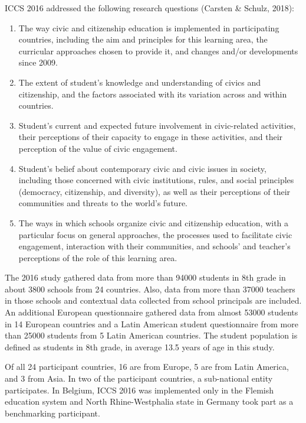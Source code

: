 \documentclass[12pt,a4paper,oneside]{reedthesis}
\providecommand{\tightlist}{%
  \setlength{\itemsep}{0pt}\setlength{\parskip}{0pt}}
\begin{document}
ICCS 2016 addressed the following research questions (Carsten \& Schulz, 2018):
\begin{enumerate}
\def\labelenumi{\arabic{enumi}.}
\tightlist
\item
  The way civic and citizenship education is implemented in participating countries, including the aim and principles for this learning area, the curricular approaches chosen to provide it, and changes and/or developments since 2009.\\
\item
  The extent of student's knowledge and understanding of civics and citizenship, and the factors associated with its variation across and within countries.\\
\item
  Student's current and expected future involvement in civic-related activities, their perceptions of their capacity to engage in these activities, and their perception of the value of civic engagement.\\
\item
  Student's belief about contemporary civic and civic issues in society, including those concerned with civic institutions, rules, and social principles (democracy, citizenship, and diversity), as well as their perceptions of their communities and threats to the world's future.\\
\item
  The ways in which schools organize civic and citizenship education, with a particular focus on general approaches, the processes used to facilitate civic engagement, interaction with their communities, and schools' and teacher's perceptions of the role of this learning area.
\end{enumerate}
The 2016 study gathered data from more than 94000 students in 8th grade in about 3800 schools from 24 countries. Also, data from more than 37000 teachers in those schools and contextual data collected from school principals are included. An additional European questionnaire gathered data from almost 53000 students in 14 European countries and a Latin American student questionnaire from more than 25000 students from 5 Latin American countries. The student population is defined as students in 8th grade, in average 13.5 years of age in this study.

Of all 24 participant countries, 16 are from Europe, 5 are from Latin America, and 3 from Asia. In two of the participant countries, a sub-national entity participates. In Belgium, ICCS 2016 was implemented only in the Flemish education system and North Rhine-Westphalia state in Germany took part as a benchmarking participant.
\end{document}
